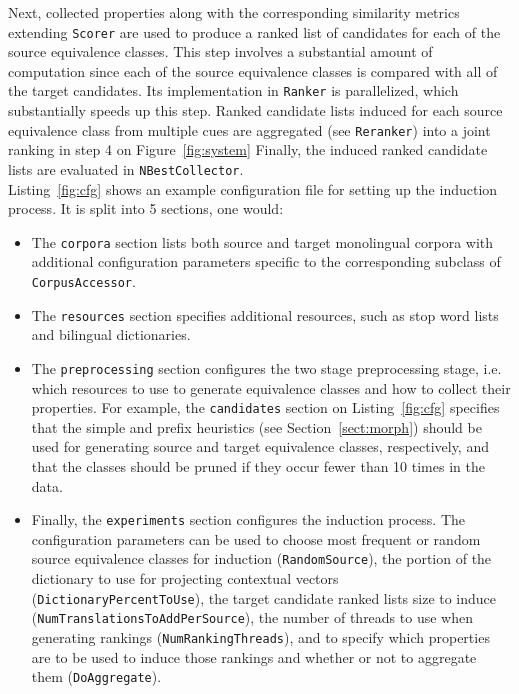 \documentclass{article}
\newcommand{\secref}[1]{Section~\ref{#1}}
\newcommand{\figref}[1]{Figure~\ref{#1}}
\newcommand{\lstref}[1]{Listing~\ref{#1}}
\begin{document}
Next, collected properties along with the corresponding similarity metrics extending \small{\tt Scorer} are used to produce a ranked list of candidates for each of the source equivalence classes.  This step involves a substantial amount of computation since each of the source equivalence classes is compared with all of the target candidates. Its implementation in \small{\tt Ranker} is parallelized, which substantially speeds up this step.  Ranked candidate lists induced for each source equivalence class from multiple cues are aggregated (see \small{\tt Reranker}) into a joint ranking in step 4 on \figref{fig:system}  Finally, the induced ranked candidate lists are evaluated in \small{\tt NBestCollector}.\\

\lstref{fig:cfg} shows an example configuration file for setting up the induction process.  It is split into 5 sections, one would:

\begin{itemize}
  \item The \small{\tt  corpora} section lists both source and target monolingual corpora with additional configuration parameters specific to the corresponding subclass of \small{\tt CorpusAccessor}.
  \item The \small{\tt  resources} section specifies additional resources, such as stop word lists and bilingual dictionaries.
  \item The \small{\tt  preprocessing} section configures the two stage preprocessing stage, i.e. which resources to use to generate equivalence classes and how to collect their properties.  For example, the \small{\tt  candidates} section on \lstref{fig:cfg} specifies that the simple and prefix heuristics (see \secref{sect:morph}) should be used for generating source and target equivalence classes, respectively, and that the classes should be pruned if they occur fewer than 10 times in the data.
  \item Finally, the \small{\tt experiments} section configures the induction process.  The configuration parameters can be used to choose most frequent or random source equivalence classes for induction (\small{\tt RandomSource}), the portion of the dictionary to use for projecting contextual vectors (\small{\tt DictionaryPercentToUse}), the target candidate ranked lists size to induce  (\small{\tt NumTranslationsToAddPerSource}), the number of threads to use when generating rankings (\small{\tt NumRankingThreads}), and to specify which properties are to be used to induce those rankings and whether or not to aggregate them (\small{\tt DoAggregate}).\\
\end{itemize}
\end{document}
